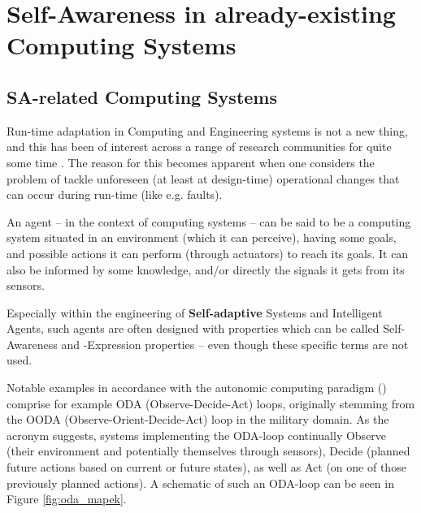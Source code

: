 \documentclass{article}
\begin{document}
\section{Self-Awareness in already-existing Computing Systems}

\subsection{SA-related Computing Systems}
Run-time adaptation in Computing and Engineering systems is not a new thing, and this has been of interest across a range of research communities for quite some time \cite{sacs16_ch4}. The reason for this becomes apparent when one considers the problem of tackle unforeseen (at least at design-time) operational changes that can occur during run-time (like e.g. faults).

An agent -- in the context of computing systems -- can be said to be a computing system situated in an environment (which it can perceive), having some goals, and possible actions it can perform (through actuators) to reach its goals. It can also be informed by some knowledge, and/or directly the signals it gets from its sensors.

Especially within the engineering of \textbf{Self-adaptive} Systems and Intelligent Agents, such agents are often designed with properties which can be called Self-Awareness and -Expression properties -- even though these specific terms are not used.

Notable examples in accordance with the autonomic computing paradigm (\cite{sacs16_ch4}) comprise for example ODA (Observe-Decide-Act) loops, originally stemming from the OODA (Observe-Orient-Decide-Act) loop in the military domain. As the acronym suggests, systems implementing the ODA-loop continually Observe (their environment and potentially themselves through sensors), Decide (planned future actions based on current or future states), as well as Act (on one of those previously planned actions). A schematic of such an ODA-loop can be seen in Figure \ref{fig:oda_mapek}.
\end{document}
